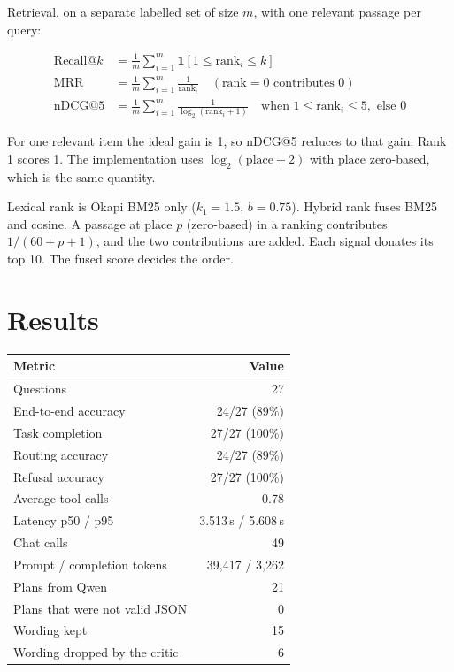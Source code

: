 \documentclass[11pt,a4paper]{article}
\begin{document}
Retrieval, on a separate labelled set of size $m$, with one relevant passage per query:

\begin{align*}
\mathrm{Recall@}k &= \frac{1}{m}\sum_{i=1}^{m} \mathbf{1}[1 \le \mathrm{rank}_i \le k] \\
\mathrm{MRR} &= \frac{1}{m}\sum_{i=1}^{m} \frac{1}{\mathrm{rank}_i}\quad(\mathrm{rank}=0 \text{ contributes } 0) \\
\mathrm{nDCG@5} &= \frac{1}{m}\sum_{i=1}^{m} \frac{1}{\log_2(\mathrm{rank}_i+1)}\quad\text{when } 1\le\mathrm{rank}_i\le 5,\text{ else } 0
\end{align*}

For one relevant item the ideal gain is 1, so nDCG@5 reduces to that gain. Rank 1 scores 1. The implementation uses $\log_2(\mathrm{place}+2)$ with $\mathrm{place}$ zero-based, which is the same quantity.

Lexical rank is Okapi BM25 only ($k_1=1.5$, $b=0.75$). Hybrid rank fuses BM25 and cosine. A passage at place $p$ (zero-based) in a ranking contributes $1/(60+p+1)$, and the two contributions are added. Each signal donates its top 10. The fused score decides the order.

\section{Results}

\begin{center}
\begin{tabular}{@{}lr@{}}
\toprule
Metric & Value \\
\midrule
Questions & 27 \\
End-to-end accuracy & 24/27 (89\%) \\
Task completion & 27/27 (100\%) \\
Routing accuracy & 24/27 (89\%) \\
Refusal accuracy & 27/27 (100\%) \\
Average tool calls & 0.78 \\
Latency p50 / p95 & 3.513\,s / 5.608\,s \\
Chat calls & 49 \\
Prompt / completion tokens & 39{,}417 / 3{,}262 \\
Plans from Qwen & 21 \\
Plans that were not valid JSON & 0 \\
Wording kept & 15 \\
Wording dropped by the critic & 6 \\
\bottomrule
\end{tabular}
\end{center}
\end{document}
